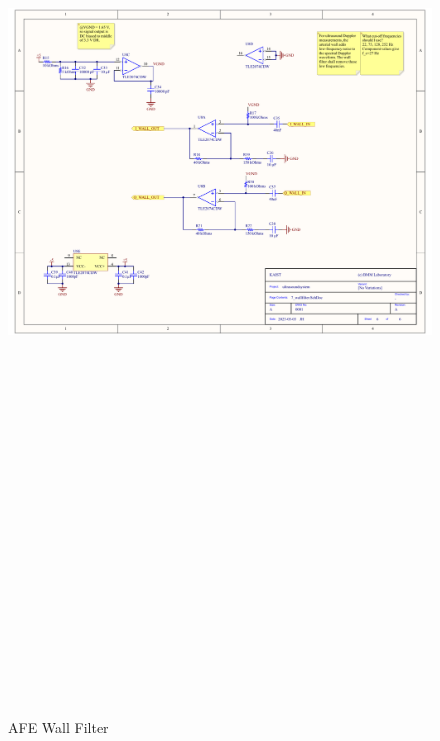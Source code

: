 \begin{landscape}
	\begin{figure}[htbp]
		\centering
		\includegraphics[width=20cm,height=28.7cm,keepaspectratio]{Figures/appendix/afe_altium/7_wallfilter.pdf}
		\caption{AFE Wall Filter}
		\label{fig:appendix_7_wallfilter}
	\end{figure}
\end{landscape}
